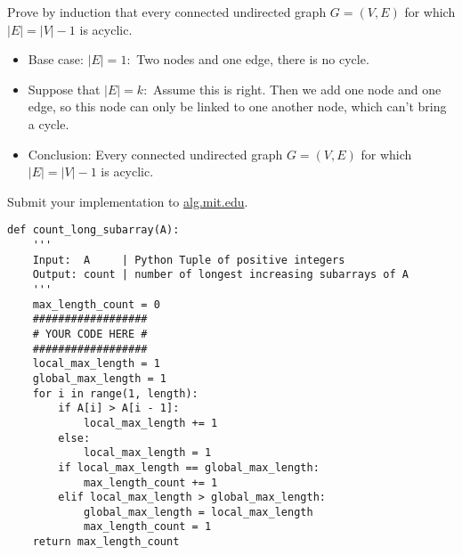 \documentclass[12pt,twoside]{article}
\begin{document}
\begin{problems}
\newpage
\problem  %
Prove by induction that every connected undirected graph $G = (V, E)$ for which 
$|E| = |V| - 1$ is acyclic. 

\begin{itemize}
    \item \;
    Base case: $|E|=1:$ Two nodes and one edge, there is no cycle.
    \item \;
    Suppose that $|E|=k:$ Assume this is right. Then we add one node and one edge, so 
    this node can only be linked to one another node, which can't bring a cycle.
    \item \;
    Conclusion: Every connected undirected graph $G = (V, E)$ for which 
    $|E| = |V| - 1$ is acyclic. 
\end{itemize}


\problem  %
Submit your implementation to {\small\url{alg.mit.edu}}.

\begin{lstlisting}
def count_long_subarray(A):
    '''
    Input:  A     | Python Tuple of positive integers
    Output: count | number of longest increasing subarrays of A
    '''
    max_length_count = 0
    ##################
    # YOUR CODE HERE #
    ##################
    local_max_length = 1
    global_max_length = 1
    for i in range(1, length):
        if A[i] > A[i - 1]:
            local_max_length += 1
        else:
            local_max_length = 1
        if local_max_length == global_max_length:
            max_length_count += 1
        elif local_max_length > global_max_length:
            global_max_length = local_max_length
            max_length_count = 1
    return max_length_count
\end{lstlisting}

\end{problems}
\end{document}
